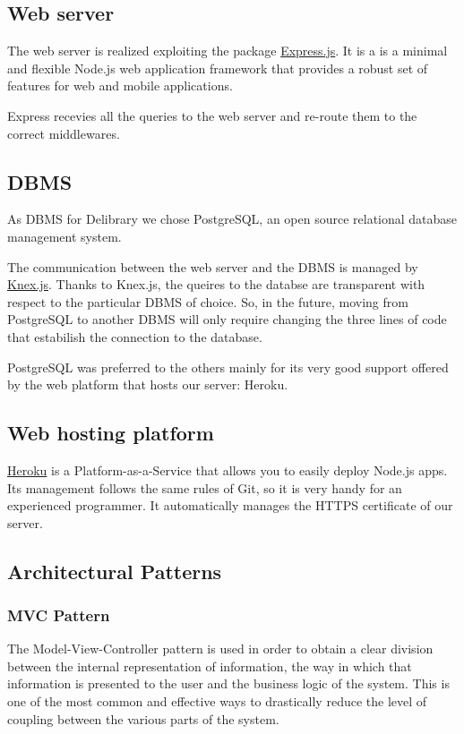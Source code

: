 \subsection{Web server}
The web server is realized exploiting the package \href{https://expressjs.com}{Express.js}.
It is a is a minimal and flexible Node.js web application framework that provides a robust set of features for web and mobile applications.

Express recevies all the queries to the web server and re-route them to the correct middlewares.

\subsection{DBMS}
As DBMS for Delibrary we chose PostgreSQL, an open source relational database management system.

The communication between the web server and the DBMS is managed by \href{https://knexjs.org}{Knex.js}.
Thanks to Knex.js, the queires to the databse are transparent with respect to the particular DBMS of choice.
So, in the future, moving from PostgreSQL to another DBMS will only require changing the three lines of code that estabilish the connection to the database.

PostgreSQL was preferred to the others mainly for its very good support offered by the web platform that hosts our server: Heroku.

\subsection{Web hosting platform}
\href{https://www.heroku.com/home}{Heroku} is a Platform-as-a-Service that allows you to easily deploy Node.js apps.
Its management follows the same rules of Git, so it is very handy for an experienced programmer.
It automatically manages the HTTPS certificate of our server.

\subsection{Architectural Patterns}

\subsubsection{MVC Pattern}
The Model-View-Controller pattern is used in order to obtain a clear division between the internal representation of information, the way in which that information is presented to the user and the business logic of the system.
This is one of the most common and effective ways to drastically reduce the level of coupling between the various parts of the system.

